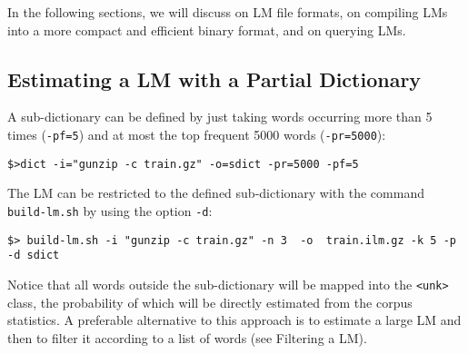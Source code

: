\noindent
In the following sections, we will discuss on LM file formats, on compiling LMs into a 
more compact and efficient binary format, and on querying LMs.

\subsection{Estimating a LM with a Partial Dictionary}

A sub-dictionary can be defined by just taking words occurring more than 5 times ({\tt -pf=5})
and at most the top frequent 5000 words ({\tt -pr=5000}):
\begin{verbatim}
$>dict -i="gunzip -c train.gz" -o=sdict -pr=5000 -pf=5 
\end{verbatim}


\noindent
The LM can be restricted to the defined sub-dictionary with the 
command {\tt build-lm.sh} by using the option {\tt -d}: 
\begin{verbatim}
$> build-lm.sh -i "gunzip -c train.gz" -n 3  -o  train.ilm.gz -k 5 -p -d sdict 
\end{verbatim}

\noindent
Notice that all words outside the sub-dictionary will be mapped into the {\tt <unk>}
class, the probability of which will be directly estimated from the corpus statistics.
A preferable alternative to this approach is to estimate a large LM and then to filter
it according to a list of words (see Filtering a LM).

